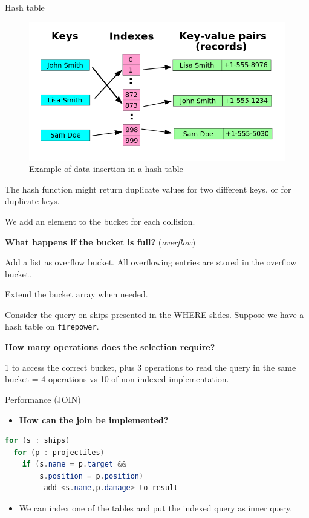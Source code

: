 \documentclass{beamer}
\begin{document}
\begin{frame}{Hash table}
\begin{figure}
\centering
\includegraphics[scale=0.25]{img/hash_table}
\caption{Example of data insertion in a hash table}
\end{figure}
\end{frame}

\begin{slide}{
\item The hash function might return duplicate values for two different keys, or for duplicate keys.
\item We add an element to the bucket for each collision.
\item \textbf{What happens if the bucket is full?} (\textit{overflow})
\pause
\item Add a list as overflow bucket. All overflowing entries are stored in the overflow bucket.
\item Extend the bucket array when needed.
}\end{slide}

\begin{slide}{
\item Consider the query on ships presented in the WHERE slides. Suppose we have a hash table on \texttt{firepower}.
\item \textbf{How many operations does the selection require?}
\item 1 to access the correct bucket, plus 3 operations to read the query in the same bucket = 4 operations vs 10 of non-indexed implementation.
}\end{slide}

\begin{frame}[fragile]{Performance (JOIN)}
\begin{itemize}
\item \textbf{How can the join be implemented?}
\pause
\end{itemize}
\begin{lstlisting}[language = Java]
for (s : ships)
  for (p : projectiles)
    if (s.name = p.target &&
        s.position = p.position)
         add <s.name,p.damage> to result
\end{lstlisting}
\begin{itemize}
\item We can index one of the tables and put the indexed query as inner query.
\end{itemize}
\end{frame}
\end{document}
